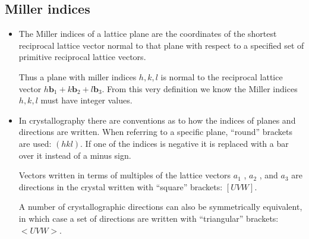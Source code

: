 \documentclass[11pt]{article}
\numberwithin{equation}{section}
\begin{document}
\subsection{Miller indices}
\begin{itemize}
    \item The Miller indices of a lattice plane are the coordinates of the shortest reciprocal lattice vector normal to that plane with respect to a specified set of primitive reciprocal lattice vectors. 

Thus a plane with miller indices $h,k,l$ is normal to the reciprocal lattice vector $h \textbf{b}_1 + k \textbf{b}_2 + l \textbf{b}_3$. From this very definition we know the Miller indices $h,k,l$ must have integer values.  
\end{itemize}

\begin{itemize}
    \item In crystallography there are conventions as to how the indices of planes and directions are written. When referring to a specific plane, “round” brackets are used:  $(hkl)$.  If one of  the indices is negative it is replaced with a bar over it instead of a minus sign.

Vectors written in terms of multiples of the lattice vectors $a_1$ , $a_2$ , and $a_3$ are directions in the crystal written with “square” brackets: $[UVW]$. 

A number of crystallographic directions can also be symmetrically equivalent, in which case a set of directions are written with “triangular” brackets:  $<UVW>$. 
\end{itemize}
\end{document}
